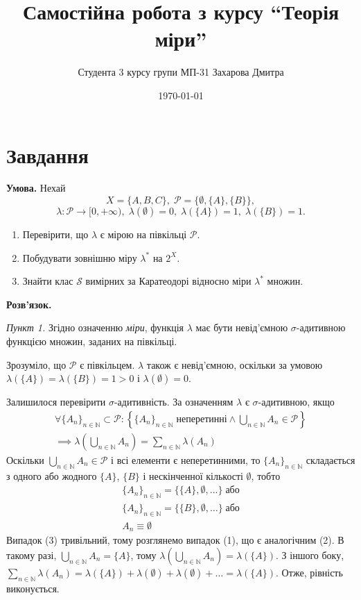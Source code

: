 \documentclass[14pt]{extarticle}
\title{Самостійна робота з курсу ``Теорія міри''}
\author{Студента 3 курсу групи МП-31 Захарова Дмитра}
\date{\today}
\begin{document}
\maketitle

\section*{Завдання}
\textbf{Умова.} Нехай
\[
X = \{A,B,C\}, \; \mathcal{P} = \{\emptyset, \{A\}, \{B\}\},
\]
\[
\lambda: \mathcal{P} \to [0,+\infty), \; \lambda(\emptyset) = 0, \; \lambda(\{A\}) = 1, \; \lambda(\{B\}) = 1.
\]
\begin{enumerate}
    \item Перевірити, що $\lambda$ є мірою на півкільці $\mathcal{P}$.
    \item Побудувати зовнішню міру $\lambda^*$ на $2^X$.
    \item Знайти клас $\mathcal{S}$ вимірних за Каратеодорі відносно міри $\lambda^*$ множин.
\end{enumerate}

\textbf{Розв'язок.} 

\textit{Пункт 1.} Згідно означенню \textit{міри}, функція $\lambda$ має бути невід'ємною $\sigma$-адитивною функцією множин, заданих на півкільці.

Зрозуміло, що $\mathcal{P}$ є півкільцем. $\lambda$ також є невід'ємною, оскільки за умовою $\lambda(\{A\}) = \lambda(\{B\}) = 1 > 0$ і $\lambda(\emptyset) = 0$. 

Залишилося перевірити $\sigma$-адитивність. За означенням $\lambda$ є $\sigma$-адитивною, якщо
\begin{gather*}
\forall \{A_n\}_{n \in \mathbb{N}} \subset \mathcal{P}: \left\{\{A_n\}_{n \in \mathbb{N}} \; \text{неперетинні} \wedge \bigcup_{n \in \mathbb{N}}A_n \in \mathcal{P}\right\} \\ \implies \lambda\left(\bigcup_{n \in \mathbb{N}}A_n\right) = \sum_{n \in \mathbb{N}}\lambda(A_n)
\end{gather*}
Оскільки $\bigcup_{n \in \mathbb{N}}A_n \in \mathcal{P}$ і всі елементи є неперетинними, то $\{A_n\}_{n \in \mathbb{N}}$ складається з одного або жодного $\{A\}$, $\{B\}$ і нескінченної кількості $\emptyset$, тобто
\begin{gather}
\{A_n\}_{n \in \mathbb{N}} = \{\{A\},\emptyset,\dots\} \; \text{або} \\
\{A_n\}_{n \in \mathbb{N}} = \{\{B\},\emptyset,\dots\} \; \text{або} \\
A_n \equiv \emptyset
\end{gather}
Випадок (3) тривільний, тому розглянемо випадок (1), що є аналогічним (2). В такому разі, $\bigcup_{n \in \mathbb{N}}A_n = \{A\}$, тому $\lambda(\bigcup_{n \in \mathbb{N}}A_n)=\lambda(\{A\})$. З іншого боку, $\sum_{n \in \mathbb{N}}\lambda(A_n) = \lambda(\{A\}) + \lambda(\emptyset) + \lambda(\emptyset) + \dots = \lambda(\{A\})$. Отже, рівність виконується.
\end{document}
